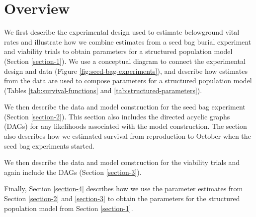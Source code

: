 \documentclass[12pt, oneside, titlepage]{article}   	%
\begin{document}


\section*{Overview}

We first describe the experimental design used to estimate belowground vital rates and illustrate how we combine estimates from a seed bag burial experiment and viability trials to obtain parameters for a structured population model (Section \ref{section-1}). We use a conceptual diagram to connect the experimental design and data (Figure \ref{fig:seed-bag-experiments}), and describe how estimates from the data are used to compose parameters for a structured population model (Tables \ref{tab:survival-functions} and \ref{tab:structured-parameters}).

We then describe the data and model construction for the seed bag experiment (Section \ref{section-2}). This section also includes the directed acyclic graphs (DAGs) for any likelihoods associated with the model construction. The section also describes how we estimated survival from reproduction to October when the seed bag experiments started. 

We then describe the data and model construction for the viability trials and again include the DAGs (Section \ref{section-3}).

Finally, Section \ref{section-4} describes how we use the parameter estimates from Section \ref{section-2} and \ref{section-3} to obtain the parameters for the structured population model from Section \ref{section-1}.
\end{document}
